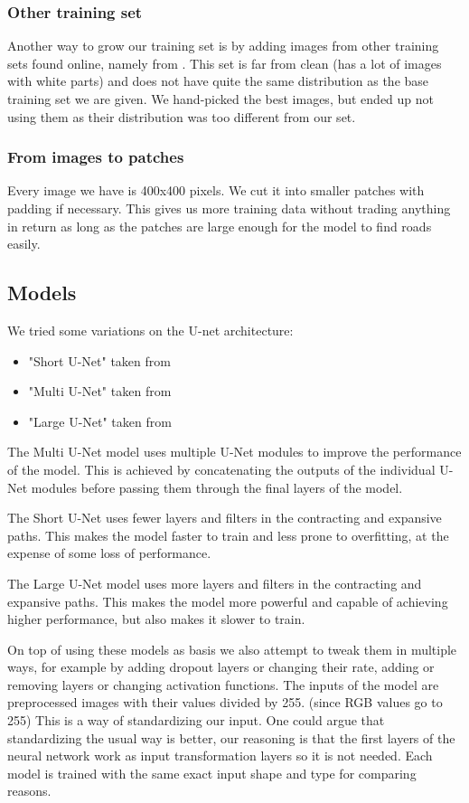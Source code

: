 \documentclass[10pt,conference,compsocconf]{IEEEtran}
\begin{document}
\subsubsection{Other training set}
\label{otherset}
Another way to grow our training set is by adding images from other training sets found online, namely from \cite{newtraining}. This set is far from clean (has a lot of images with white parts) and does not have quite the same distribution as the base training set we are given. We hand-picked the best images, but ended up not using them as their distribution was too different from our set.
\subsubsection{From images to patches}
Every image we have is 400x400 pixels. We cut it into smaller patches with padding if necessary. This gives us more training data without trading anything in return as long as the patches are large enough for the model to find roads easily.
\subsection{Models}
\label{models}
We tried some variations on the U-net architecture:
\begin{itemize}
\item "Short U-Net" taken from \cite{short-unet}
\item "Multi U-Net" taken from \cite{multi-unet}
\item "Large U-Net" taken from \cite{large-unet}
\end{itemize}
The Multi U-Net model uses multiple U-Net modules to improve the performance of the model. This is achieved by concatenating the outputs of the individual U-Net modules before passing them through the final layers of the model.

The Short U-Net uses fewer layers and filters in the contracting and expansive paths. This makes the model faster to train and less prone to overfitting, at the expense of some loss of performance.

The Large U-Net model uses more layers and filters in the contracting and expansive paths. This makes the model more powerful and capable of achieving higher performance, but also makes it slower to train.

On top of using these models as basis we also attempt to tweak them in multiple ways, for example by adding dropout layers or changing their rate, adding or removing layers or changing activation functions.
The inputs of the model are preprocessed images with their values divided by 255. (since RGB values go to 255) This is a way of standardizing our input. One could argue that standardizing the usual way is better, our reasoning is that the first layers of the neural network work as input transformation layers so it is not needed. Each model is trained with the same exact input shape and type for comparing reasons.
\end{document}
